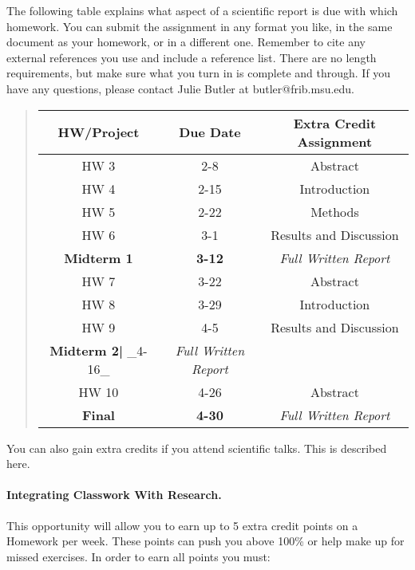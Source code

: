 \documentclass[%
oneside,                 %
final,                   %
10pt]{article}
\begin{document}
The following table explains what aspect of a scientific report is due
with which homework.  You can submit the assignment in any format you
like, in the same document as your homework, or in a different one.
Remember to cite any external references you use and include a
reference list.  There are no length requirements, but make sure what
you turn in is complete and through.  If you have any questions,
please contact Julie Butler at butler@frib.msu.edu.


\begin{quote}
\begin{tabular}{ccc}
\hline
\multicolumn{1}{c}{ HW/Project } & \multicolumn{1}{c}{ Due Date } & \multicolumn{1}{c}{ Extra Credit Assignment } \\
\hline
HW 3                       & 2-8                        & Abstract                   \\
HW 4                       & 2-15                       & Introduction               \\
HW 5                       & 2-22                       & Methods                    \\
HW 6                       & 3-1                        & Results and Discussion     \\
\textbf{Midterm 1}         & \textbf{3-12}              & \emph{Full Written Report} \\
HW 7                       & 3-22                       & Abstract                   \\
HW 8                       & 3-29                       & Introduction               \\
HW 9                       & 4-5                        & Results and Discussion     \\
\textbf{Midterm 2|} _4-16_ & \emph{Full Written Report} \\
HW 10                      & 4-26                       & Abstract                   \\
\textbf{Final}             & \textbf{4-30}              & \emph{Full Written Report} \\
\hline
\end{tabular}
\end{quote}

\noindent
You can also gain extra credits if you attend scientific talks.
This is described here.

\paragraph{Integrating Classwork With Research.}
This opportunity will allow you to earn up to 5 extra credit points on a Homework per week. These points can push you above 100\% or help make up for missed exercises.
In order to earn all points you must:
\end{document}

